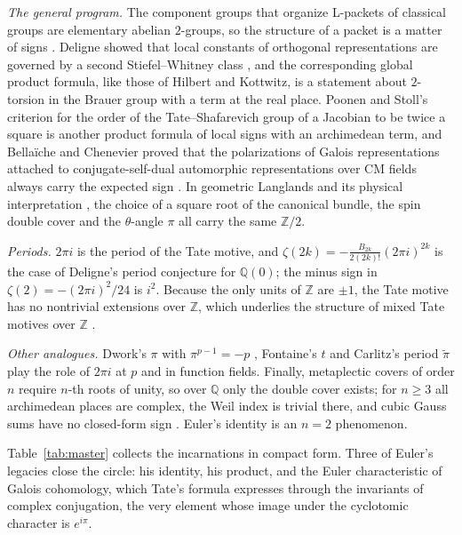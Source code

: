 \documentclass[11pt]{amsart}
\numberwithin{equation}{section}
\newcommand{\Q}{\mathbb{Q}}
\newcommand{\Z}{\mathbb{Z}}
\begin{document}
\emph{The general program.} The component groups that organize L-packets of classical groups are elementary abelian $2$-groups, so the structure of a packet is a matter of signs \cite{Arthur2013}. Deligne showed that local constants of orthogonal representations are governed by a second Stiefel--Whitney class \cite{Deligne1976}, and the corresponding global product formula, like those of Hilbert and Kottwitz, is a statement about $2$-torsion in the Brauer group with a term at the real place. Poonen and Stoll's criterion for the order of the Tate--Shafarevich group of a Jacobian to be twice a square \cite{PoonenStoll1999} is another product formula of local signs with an archimedean term, and Bella\"iche and Chenevier proved that the polarizations of Galois representations attached to conjugate-self-dual automorphic representations over CM fields always carry the expected sign \cite{BellaicheChenevier2011}. In geometric Langlands and its physical interpretation \cite{KapustinWitten2007}, the choice of a square root of the canonical bundle, the spin double cover and the $\theta$-angle $\pi$ all carry the same $\Z/2$.

\emph{Periods.} $2\pi i$ is the period of the Tate motive, and $\zeta(2k)=-\frac{B_{2k}}{2(2k)!}(2\pi i)^{2k}$ is the case of Deligne's period conjecture \cite{Deligne1979} for $\Q(0)$; the minus sign in $\zeta(2)=-(2\pi i)^2/24$ is $i^2$. Because the only units of $\Z$ are $\pm1$, the Tate motive has no nontrivial extensions over $\Z$, which underlies the structure of mixed Tate motives over $\Z$ \cite{DeligneGoncharov2005,Brown2012}.

\emph{Other analogues.} Dwork's $\pi$ with $\pi^{p-1}=-p$ \cite{Dwork1960}, Fontaine's $t$ \cite{Fontaine1994} and Carlitz's period $\tilde\pi$ \cite{Carlitz1935} play the role of $2\pi i$ at $p$ and in function fields. Finally, metaplectic covers of order $n$ require $n$-th roots of unity, so over $\Q$ only the double cover exists; for $n\ge3$ all archimedean places are complex, the Weil index is trivial there, and cubic Gauss sums have no closed-form sign \cite{HeathBrownPatterson1979,DunnRadziwill2024}. Euler's identity is an $n=2$ phenomenon.

Table~\ref{tab:master} collects the incarnations in compact form. Three of Euler's legacies close the circle: his identity, his product, and the Euler characteristic of Galois cohomology, which Tate's formula expresses through the invariants of complex conjugation, the very element whose image under the cyclotomic character is $e^{i\pi}$.
\end{document}

